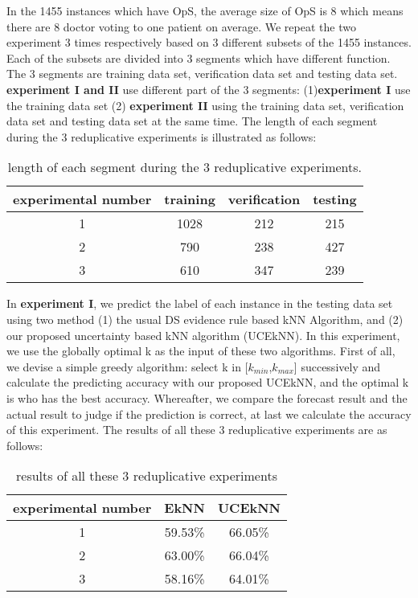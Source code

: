 \documentclass[runningheads]{llncs}
\begin{document}
In the 1455 instances which have OpS, the average size of OpS is 8 which means there are 8 doctor voting to one patient on average. We repeat the two experiment 3 times respectively based on 3 different subsets of the 1455 instances. Each of the subsets are divided into 3 segments which have different function. The 3 segments are training data set, verification data set and testing data set. \textbf{experiment I and II} use different part of the 3 segments: (1)\textbf{experiment I} use the training data set (2) \textbf{experiment II} using the training data set, verification data set and testing data set at the same time. The length of each segment during the 3 reduplicative experiments is illustrated as follows:

\begin{table}
\begin{center}
\caption{length of each segment during the 3 reduplicative experiments.}\label{tab1}
\begin{tabular}{|c|c|c|c|}
\hline
experimental number &  training & verification & testing\\
\hline
1 & 1028 & 212 & 215\\
2 & 790 & 238 & 427\\
3 & 610 & 347 & 239\\
\hline
\end{tabular}    
\end{center}
\end{table}

In  \textbf{experiment I}, we predict the label of each instance in the testing data set using two method (1) the usual DS evidence rule based kNN Algorithm, and (2) our proposed uncertainty based kNN algorithm (UCEkNN). In this experiment, we use the globally optimal k as the input of these two algorithms. First of all, we devise a simple greedy algorithm: select k in [$k_{min}$,$k_{max}$]  successively and calculate the predicting accuracy with our proposed UCEkNN, and the optimal k is who has the best accuracy. Whereafter, we compare the forecast result and the actual result to judge if the prediction is correct, at last we calculate the accuracy of this experiment. The results of all these 3 reduplicative experiments are as follows:

\begin{table}
\begin{center}
\caption{results of all these 3 reduplicative experiments}\label{tab1}
\begin{tabular}{|c|c|c|}
\hline
experimental number &  EkNN & UCEkNN\\
\hline
1 & 59.53\% & 66.05\%\\
2 & 63.00\% & 66.04\% \\
3 & 58.16\% & 64.01\%\\
\hline
\end{tabular}    
\end{center}
\end{table}
\end{document}
